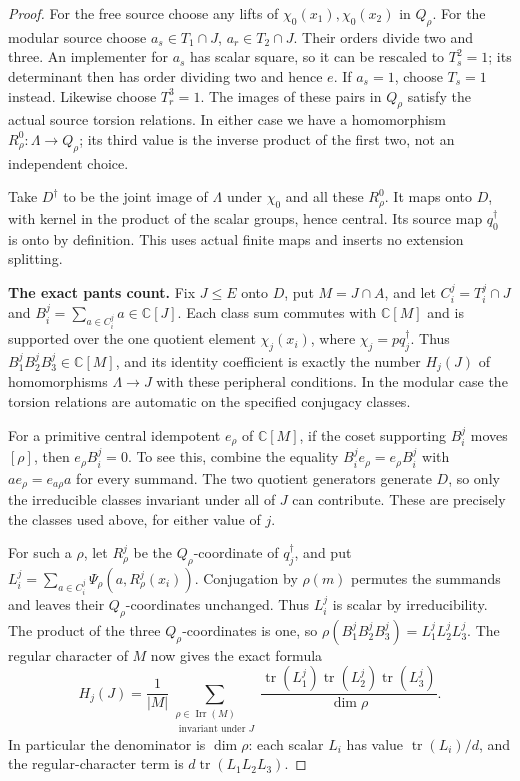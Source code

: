 \begin{proof}
For the free source choose any lifts of
$\chi_0(x_1),\chi_0(x_2)$ in $Q_\rho$.
For the modular source choose
$a_s\in T_1\cap J$, $a_r\in T_2\cap J$.
Their orders divide two and three. An implementer for
$a_s$ has scalar square, so it can be rescaled to
$T_s^2=1$; its determinant then has order dividing two
and hence $e$. If $a_s=1$, choose $T_s=1$ instead.
Likewise choose $T_r^3=1$.
The images of these pairs in $Q_\rho$ satisfy the
actual source torsion relations. In either case we
have a homomorphism $R_\rho^0:\Lambda\to Q_\rho$;
its third value is the inverse product of the first
two, not an independent choice.

Take $D^\dagger$ to be the joint image of $\Lambda$
under $\chi_0$ and all these $R_\rho^0$.
It maps onto $D$, with kernel in the product of the
scalar groups, hence central. Its source map
$q_0^\dagger$ is onto by definition. This uses actual
finite maps and inserts no extension splitting.

\medskip\noindent\textbf{The exact pants count.}
Fix $J\leq E$ onto $D$, put $M=J\cap A$, and let
$C_i^j=T_i^j\cap J$ and
$B_i^j=\sum_{a\in C_i^j}a\in\mathbb C[J]$.
Each class sum commutes with $\mathbb C[M]$ and is
supported over the one quotient element
$\chi_j(x_i)$, where $\chi_j=pq_j^\dagger$.
Thus $B_1^jB_2^jB_3^j\in\mathbb C[M]$, and its
identity coefficient is exactly the number $H_j(J)$
of homomorphisms $\Lambda\to J$ with these peripheral
conditions. In the modular case the torsion relations
are automatic on the specified conjugacy classes.

For a primitive central idempotent $e_\rho$ of
$\mathbb C[M]$, if the coset supporting $B_i^j$
moves $[\rho]$, then $e_\rho B_i^j=0$.
To see this, combine the equality
$B_i^je_\rho=e_\rho B_i^j$ with
$a e_\rho=e_{a\rho}a$ for every summand.
The two quotient generators generate $D$, so only
the irreducible classes invariant under all of $J$
can contribute. These are precisely the classes
used above, for either value of $j$.

For such a $\rho$, let $R_\rho^j$ be the
$Q_\rho$-coordinate of $q_j^\dagger$, and put
$L_i^j=\sum_{a\in C_i^j}\Psi_\rho(a,R_\rho^j(x_i))$.
Conjugation by $\rho(m)$ permutes the summands and
leaves their $Q_\rho$-coordinates unchanged.
Thus $L_i^j$ is scalar by irreducibility.
The product of the three $Q_\rho$-coordinates is one,
so
$\rho(B_1^jB_2^jB_3^j)=L_1^jL_2^jL_3^j$.
The regular character of $M$ now gives the exact
formula
\[
 H_j(J)=\frac1{|M|}
   \sum_{\substack{\rho\in\operatorname{Irr}(M)\\
                   [\rho]\text{ invariant under }J}}
       \frac{\operatorname{tr}(L_1^j)
             \operatorname{tr}(L_2^j)
             \operatorname{tr}(L_3^j)}{\dim\rho}.
                                                               \tag{E.234}
\]
In particular the denominator is $\dim\rho$:
each scalar $L_i$ has value $\operatorname{tr}(L_i)/d$,
and the regular-character term is
$d\operatorname{tr}(L_1L_2L_3)$.


\end{proof}
